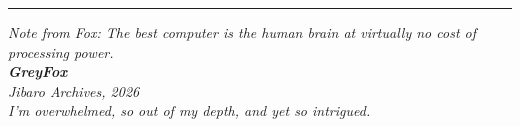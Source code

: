 \documentclass[11pt,a4paper]{article}
\begin{document}
\vspace{0.6em}
\noindent\rule{\textwidth}{0.4pt}

\begin{center}
\itshape Note from Fox: The best computer is the human brain at virtually no cost of processing power.\\[0.6em]
\upshape\textbf{GreyFox}\\[0.3em]
\itshape Jibaro Archives, 2026\\[0.5em]
\itshape\color{gray!50!black} I'm overwhelmed, so out of my depth, and yet so intrigued.
\end{center}
\end{document}
